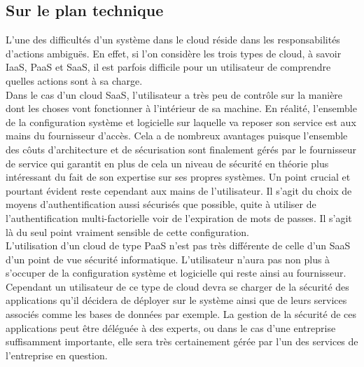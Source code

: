 \documentclass[a4paper, 12pt]{article}
\begin{document}
    \subsection{Sur le plan technique}
      L'une des difficultés d'un système dans le cloud réside dans les 
      responsabilités d'actions ambiguës. En effet, si l'on considère les 
      trois types de cloud, à savoir IaaS, PaaS et SaaS, il est parfois 
      difficile pour un utilisateur de comprendre quelles actions sont à 
      sa charge. \\

      Dans le cas d'un cloud SaaS, l'utilisateur a très peu de contrôle sur 
      la manière dont les choses vont fonctionner à l'intérieur de sa machine.
      En réalité, l'ensemble de la configuration système et logicielle sur 
      laquelle va reposer son service est aux mains du fournisseur d'accès.
      Cela a de nombreux avantages puisque l'ensemble des côuts d'architecture
      et de sécurisation sont finalement gérés par le fournisseur de service qui 
      garantit en plus de cela un niveau de sécurité en théorie plus 
      intéressant du fait de son expertise sur ses propres systèmes. Un point 
      crucial et pourtant évident reste cependant aux mains de l'utilisateur. 
      Il s'agit du choix de moyens d'authentification aussi sécurisés que 
      possible, quite à utiliser de l'authentification multi-factorielle voir
      de l'expiration de mots de passes. Il s'agit là du seul point vraiment 
      sensible de cette configuration. \\

      L'utilisation d'un cloud de type PaaS n'est pas très différente de 
      celle d'un SaaS d'un point de vue sécurité informatique. L'utilisateur 
      n'aura pas non plus à s'occuper de la configuration système et logicielle
      qui reste ainsi au fournisseur. Cependant un utilisateur de ce type de 
      cloud devra se charger de la sécurité des applications qu'il décidera de 
      déployer sur le système ainsi que de leurs services associés comme les 
      bases de données par exemple. La gestion de la sécurité de ces 
      applications peut être déléguée à des experts, ou dans le cas d'une
      entreprise suffisamment importante, elle sera très certainement gérée 
      par l'un des services de l'entreprise en question. \\
\end{document}
